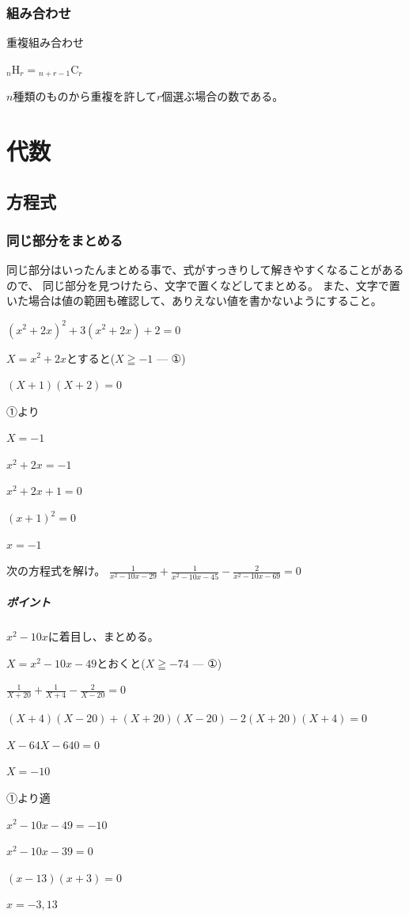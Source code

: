 \documentclass[uplatex,dvipdfmx]{jsbook}
\begin{document}
\subsection{組み合わせ}

重複組み合わせ

${}_n \mathrm{ H }_r = {}_{n+r-1} \mathrm{ C }_r$

$n$種類のものから重複を許して$r$個選ぶ場合の数である。

\chapter{代数}
\section{方程式}
\subsection{同じ部分をまとめる}
同じ部分はいったんまとめる事で、式がすっきりして解きやすくなることがあるので、
同じ部分を見つけたら、文字で置くなどしてまとめる。
また、文字で置いた場合は値の範囲も確認して、ありえない値を書かないようにすること。

\begin{problem}[例題]
    $\left(x^2+2x\right)^2+3\left(x^2+2x\right)+2=0$

    $X=x^2+2x$とすると($X\geqq-1$ --- ①)

    $\left(X+1\right)\left(X+2\right)=0$

    ①より

    $X=-1$

    $x^2+2x=-1$

    $x^2+2x+1=0$

    $\left(x+1\right)^2=0$

    $x=-1$
\end{problem}

\begin{problem}[練習問題]
    次の方程式を解け。
    $\displaystyle\frac{1}{x^2-10x-29}+\frac{1}{x^2-10x-45}-\frac{2}{x^2-10x-69}=0$
\end{problem}

\paragraph{ポイント}$x^2-10x$に着目し、まとめる。


\begin{answer}
    $X=x^2-10x-49$とおくと($X\geqq-74$ --- ①)

    $\displaystyle \frac{1}{X+20}+\frac{1}{X+4}-\frac{2}{X-20}=0$

    $\left(X+4\right)\left(X-20\right)+\left(X+20\right)\left(X-20\right)-2\left(X+20\right)\left(X+4\right)=0$

    $X-64X-640=0$

    $X=-10$

    ①より適

    $x^2-10x-49=-10$

    $x^2-10x-39=0$

    $\left(x-13\right)\left(x+3\right)=0$

    $x=-3,13$
\end{answer}
\end{document}

